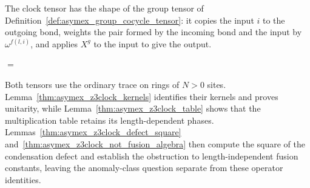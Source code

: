 The clock tensor has the shape of the group tensor of
Definition~\ref{def:asymex_group_cocycle_tensor}: it copies the input $i$ to
the outgoing bond, weights the pair formed by the incoming bond and the input
by $\omega^{f(l,i)}$, and applies $X^g$ to the input to give the output.

\begin{center}
    \tenkzkernel
    \begin{tenkz}[cols=1, bonds=none]
    \end{tenkz}
    \quad $=$ \quad
    \begin{tenkz}[rows={wire,wire,wire}, cols=2, bonds=none]
        \tn[at=(2,2), name=c, skin=dot, ports={90:physical, 270:physical, 180:physical}]{}
        \tn[at=(3,2), name=d, skin=dot, ports={90:physical, 270:physical:$i$, 0:virtual:$r$}]{}
    \end{tenkz}
\end{center}

Both tensors use the ordinary trace on rings of $N>0$ sites.
Lemma~\ref{thm:asymex_z3clock_kernels} identifies their kernels and proves
unitarity, while Lemma~\ref{thm:asymex_z3clock_table} shows that the
multiplication table retains its length-dependent phases.
Lemmas~\ref{thm:asymex_z3clock_defect_square}
and~\ref{thm:asymex_z3clock_not_fusion_algebra} then compute the square of the
condensation defect and establish the obstruction to length-independent fusion
constants, leaving the anomaly-class question separate from these operator
identities.

